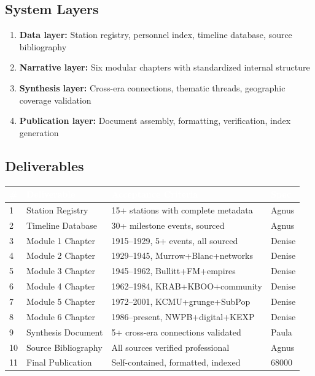 \documentclass[11pt,letterpaper]{article}
\newcommand{\tableheader}[1]{\textbf{\sffamily\textcolor{white}{#1}}}
\begin{document}
\subsection{System Layers}

\begin{enumerate}[leftmargin=2em]
\item \textbf{Data layer:} Station registry, personnel index, timeline database, source bibliography
\item \textbf{Narrative layer:} Six modular chapters with standardized internal structure
\item \textbf{Synthesis layer:} Cross-era connections, thematic threads, geographic coverage validation
\item \textbf{Publication layer:} Document assembly, formatting, verification, index generation
\end{enumerate}

\subsection{Deliverables}

\begin{center}
\begin{tabularx}{\textwidth}{C{0.5cm}L{3cm}XL{2cm}}
\toprule
{}
\tableheader{\#} & \tableheader{Deliverable} & \tableheader{Acceptance Criteria} & \tableheader{Spec} \\
 & Station Registry & 15+ stations with complete metadata & Agnus \\
2 & Timeline Database & 30+ milestone events, sourced & Agnus \\
3 & Module 1 Chapter & 1915--1929, 5+ events, all sourced & Denise \\
4 & Module 2 Chapter & 1929--1945, Murrow+Blanc+networks & Denise \\
5 & Module 3 Chapter & 1945--1962, Bullitt+FM+empires & Denise \\
6 & Module 4 Chapter & 1962--1984, KRAB+KBOO+community & Denise \\
7 & Module 5 Chapter & 1972--2001, KCMU+grunge+SubPop & Denise \\
8 & Module 6 Chapter & 1986--present, NWPB+digital+KEXP & Denise \\
9 & Synthesis Document & 5+ cross-era connections validated & Paula \\
10 & Source Bibliography & All sources verified professional & Agnus \\
11 & Final Publication & Self-contained, formatted, indexed & 68000 \\
\bottomrule
\end{tabularx}
\end{center}
\end{document}
